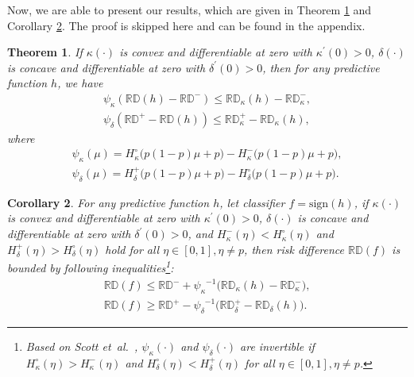 \documentclass[letterpaper]{article} %
\def\etal{et~al.~}			  %
\newcommand{\sign}{\textrm{sign}}
\newcommand{\RD}{\mathbb{RD}}
\newtheorem{theorem}{Theorem}
\newtheorem{corollary}[theorem]{Corollary}
\begin{document}
Now, we are able to present our results, which are given in Theorem \ref{thm:psi} and Corollary \ref{thm:bounds}. The proof is skipped here and can be found in the appendix.

\begin{theorem}
	\label{thm:psi}
	If $\kappa(\cdot)$ is convex and differentiable at zero with $\kappa^{\prime}(0) > 0 $, $\delta(\cdot)$ is concave and differentiable at zero with $\delta^{\prime}(0) > 0 $, then for any predictive function $h$, we have
	\begin{eqnarray*}
		\label{eq:fair_calibrated}
		\psi_{\kappa} ( \RD(h) - \RD^{-} ) \leq \RD_{\kappa}(h) - \RD_{\kappa}^{-}, \\
		\psi_{\delta} ( \RD^{+} - \RD(h) ) \leq \RD_{\kappa}^{+} - \RD_{\kappa}(h),
	\end{eqnarray*}
	where
	\begin{eqnarray*}
		\label{eq:psi1}
		\psi_{\kappa}(\mu) = H^{\circ}_{\kappa} \big( p ( 1- p) \mu + p ) - H^{-}_{\kappa} \big( p ( 1- p) \mu + p \big) , \\
		\label{eq:psi2}
		\psi_{\delta}(\mu) = H^{+}_{\delta} \big( p ( 1- p) \mu + p \big) - H^{\circ}_{\delta} \big( p ( 1- p) \mu + p ) .
	\end{eqnarray*}
\end{theorem}

\begin{corollary}\label{thm:bounds}
	For any predictive function $h$, let classifier $f = \sign(h)$, if $\kappa(\cdot)$ is convex and differentiable at zero with $\kappa^{\prime}(0) > 0 $, $\delta(\cdot)$ is concave and differentiable at zero with $\delta^{\prime}(0) > 0 $, and $H^{-}_{\kappa} (\eta) < H^{\circ}_{\kappa} (\eta)$ and $H^{+}_{\delta} (\eta) > H^{\circ}_{\delta} (\eta) $ hold for all $\eta \in [0, 1], \eta \neq p$,  then risk difference $\RD(f)$ is bounded by following inequalities\footnote{Based on Scott \etal \cite{scott2012}, $\psi_{\kappa}(\cdot)$ and $\psi_{\delta}(\cdot)$ are invertible if $H^{\circ}_{\kappa} (\eta) > H^{-}_{\kappa} (\eta)$ and $H^{\circ}_{\delta} (\eta) < H^{+}_{\delta} (\eta)$ for all $\eta \in [0, 1], \eta \neq p$.}:
	\begin{eqnarray*}
		\RD (f) \leq \RD^{-} + {\psi_{\kappa}}^{-1} \big( \RD_{ \kappa } (h) - \RD^{-}_{ \kappa } \big), \\
		\RD (f) \geq \RD^{+} - {\psi_{\delta}}^{-1} \big( \RD^{+}_{ \delta } - \RD_{ \delta } (h) \big).
	\end{eqnarray*}
\end{corollary}
\end{document}
